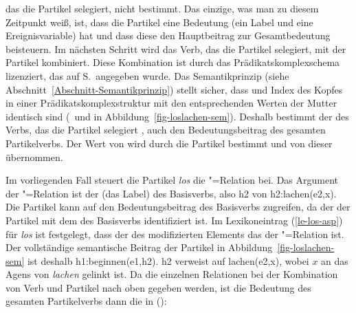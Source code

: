 das die Partikel selegiert, nicht bestimmt. Das einzige, was man zu diesem
Zeitpunkt weiß, ist, dass die Partikel eine Bedeutung (ein Label und eine Ereignisvariable) hat und
dass diese den Hauptbeitrag zur Gesamtbedeutung beisteuern. Im nächsten Schritt
wird das Verb, das die Partikel selegiert, mit der Partikel kombiniert.
Diese Kombination ist durch das Prädikatskomplexschema lizenziert,
das auf S.\,\pageref{schema-vk} angegeben wurde.
Das Semantikprinzip (siehe Abschnitt~\ref{Abschnitt-Semantikprinzip}) stellt sicher, dass \ltop und Index des Kopfes
in einer Prädikatskomplexstruktur mit den entsprechenden Werten der Mutter identisch
sind (\, und  in Abbildung~\ref{fig-loslachen-sem}). Deshalb bestimmt der \contw des Verbs, das die Partikel selegiert , 
auch den Bedeutungsbeitrag des gesamten Partikelverbs.
Der Wert von  wird durch die Partikel bestimmt und von dieser übernommen.

Im vorliegenden Fall steuert die Partikel \emph{los} die "=Relation bei.
Das Argument der "=Relation ist der \ltopw (das Label) des Basisverbs, also h2
von h2:lachen(e2,x). Die Partikel kann auf den Bedeutungsbeitrag
des Basisverbs zugreifen, da der \modw der Partikel mit dem \synsemw des Basisverbs 
identifiziert ist. Im Lexikoneintrag (\ref{le-los-asp}) für \emph{los} ist festgelegt,
dass der \ltopw des modifizierten Elements das \argone der "=Relation ist.
Der vollständige semantische Beitrag der Partikel in Abbildung~\ref{fig-loslachen-sem} 
ist deshalb h1:beginnen(e1,h2). h2 verweist auf lachen(e2,x), wobei $x$ an das Agens von \emph{lachen} gelinkt ist.
Da die einzelnen Relationen bei der Kombination von Verb und Partikel nach oben gegeben werden, ist
die Bedeutung des gesamten Partikelverbs dann die in ():
\ea
{}
\z

